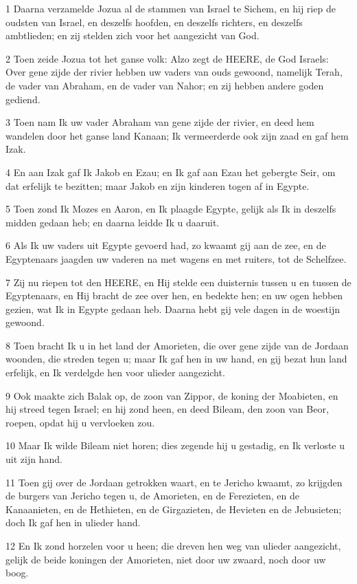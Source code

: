 \par 1 Daarna verzamelde Jozua al de stammen van Israel te Sichem, en hij riep de oudsten van Israel, en deszelfs hoofden, en deszelfs richters, en deszelfs ambtlieden; en zij stelden zich voor het aangezicht van God.
\par 2 Toen zeide Jozua tot het ganse volk: Alzo zegt de HEERE, de God Israels: Over gene zijde der rivier hebben uw vaders van ouds gewoond, namelijk Terah, de vader van Abraham, en de vader van Nahor; en zij hebben andere goden gediend.
\par 3 Toen nam Ik uw vader Abraham van gene zijde der rivier, en deed hem wandelen door het ganse land Kanaan; Ik vermeerderde ook zijn zaad en gaf hem Izak.
\par 4 En aan Izak gaf Ik Jakob en Ezau; en Ik gaf aan Ezau het gebergte Seir, om dat erfelijk te bezitten; maar Jakob en zijn kinderen togen af in Egypte.
\par 5 Toen zond Ik Mozes en Aaron, en Ik plaagde Egypte, gelijk als Ik in deszelfs midden gedaan heb; en daarna leidde Ik u daaruit.
\par 6 Als Ik uw vaders uit Egypte gevoerd had, zo kwaamt gij aan de zee, en de Egyptenaars jaagden uw vaderen na met wagens en met ruiters, tot de Schelfzee.
\par 7 Zij nu riepen tot den HEERE, en Hij stelde een duisternis tussen u en tussen de Egyptenaars, en Hij bracht de zee over hen, en bedekte hen; en uw ogen hebben gezien, wat Ik in Egypte gedaan heb. Daarna hebt gij vele dagen in de woestijn gewoond.
\par 8 Toen bracht Ik u in het land der Amorieten, die over gene zijde van de Jordaan woonden, die streden tegen u; maar Ik gaf hen in uw hand, en gij bezat hun land erfelijk, en Ik verdelgde hen voor ulieder aangezicht.
\par 9 Ook maakte zich Balak op, de zoon van Zippor, de koning der Moabieten, en hij streed tegen Israel; en hij zond heen, en deed Bileam, den zoon van Beor, roepen, opdat hij u vervloeken zou.
\par 10 Maar Ik wilde Bileam niet horen; dies zegende hij u gestadig, en Ik verloste u uit zijn hand.
\par 11 Toen gij over de Jordaan getrokken waart, en te Jericho kwaamt, zo krijgden de burgers van Jericho tegen u, de Amorieten, en de Ferezieten, en de Kanaanieten, en de Hethieten, en de Girgazieten, de Hevieten en de Jebusieten; doch Ik gaf hen in ulieder hand.
\par 12 En Ik zond horzelen voor u heen; die dreven hen weg van ulieder aangezicht, gelijk de beide koningen der Amorieten, niet door uw zwaard, noch door uw boog.
